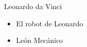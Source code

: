
\begin{frame}[fragile]{Leonardo da Vinci}
\vspace{10px}
\pause
{}
\begin{block}
	\begin{itemize}
		\item El robot de Leonardo
		\pause
		\item León Mecánico
	\end{itemize}
\end{block}
\end{frame}















